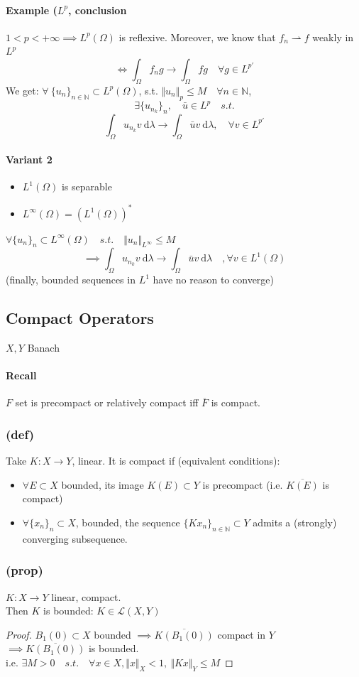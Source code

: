 \paragraph{Example ($L^p$, conclusion}
$1<p<+\infty\implies L^p(\Omega)$ is reflexive.
Moreover, we know that $f_n\rightharpoonup f$ weakly in $L^p$
$$\iff \int_\Omega f_ng \to \int_\Omega fg \quad \forall g \in L^{p'}$$
We get: $\forall \ \{u_n\}_{n\in \mathbb N}\subset L^p(\Omega)$, s.t. $\Vert u_n\Vert_p\leq M\quad \forall n\in \mathbb N$,
$$\exists \{u_{n_k}\}_n, \quad \bar u\in L^p\quad s.t.$$
$$\int_\Omega u_{n_k}v\ \mathrm d\lambda \to \int_\Omega \bar uv\ \mathrm d\lambda, \quad \forall v\in L^{p'}$$
\paragraph{Variant 2}
\begin{itemize}
    \item $L^1(\Omega)$ is separable
    \item $L^\infty(\Omega) =(L^1(\Omega))^*$
\end{itemize}
$\forall \{ u_n\}_n\subset L^\infty (\Omega)\quad s.t. \quad \Vert u_n\Vert_{L^\infty} \leq M$
$$\implies \int_\Omega u_{n_k}v \ \mathrm d\lambda \to \int_\Omega \bar u v \ \mathrm d\lambda \quad , \forall v\in L^1(\Omega)$$
(finally, bounded sequences in $L^1$ have no reason to converge)
\subsection{Compact Operators}
$X,Y$ Banach
\paragraph{Recall}
$F$ set is precompact or relatively compact iff $\overline{F}$ is compact.
\subsubsection{(def) }
Take $K:X\to Y$, linear. It is compact if (equivalent conditions):
\begin{itemize}
    \item $\forall E\subset X$ bounded, its image $K(E)\subset Y$ is precompact (i.e. $\overline{K(E)}$ is compact)
    \item
    $\forall \{x_n\}_n\subset X$, bounded, the sequence $\{ Kx_n\}_{n\in \mathbb N}\subset Y$ admits a (strongly) converging subsequence.
\end{itemize}
\subsubsection{(prop)}
$K:X\to Y$ linear, compact.\\
Then $K$ is bounded: $K\in \mathcal L(X,Y)$
\begin{proof}
    $B_1(0)\subset X$ bounded $\implies \overline{K(B_1(0))}$ compact in $Y$\\
    $\implies \overline{K(B_1(0))}$ is bounded.
\\
i.e. $\exists M>0 \quad s.t.\quad \forall x\in X, \Vert x\Vert_X<1, \ \Vert Kx\Vert_Y\leq M$
\end{proof}
